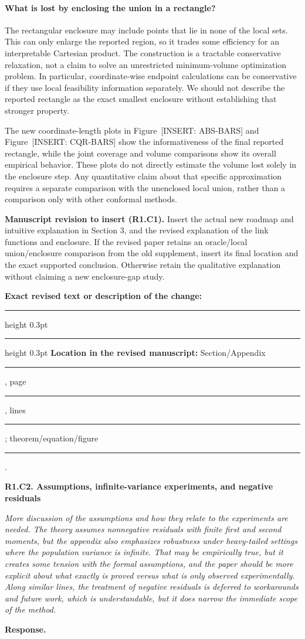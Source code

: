 \documentclass[11pt]{article}
\numberwithin{equation}{section}
\newcommand{\pending}[1]{\textcolor{AuthorRed}{[INSERT: #1]}}
\newcommand{\reviewercomment}[2]{%
  \par\medskip\noindent\textbf{#1}\par\nopagebreak
  \begingroup\color{ReviewerBlue}\itshape #2\par\endgroup
  \noindent\textbf{Response.} }
\newcommand{\revisionblock}[2]{%
  \par\begingroup\color{AuthorRed}\small
  \textbf{Manuscript revision to insert (#1).} #2\par
  \textbf{Exact revised text or description of the change:}\par
  \vspace{0.35em}\hrule height 0.3pt\vspace{1.4em}
  \hrule height 0.3pt\vspace{0.6em}
  \textbf{Location in the revised manuscript:}
  Section/Appendix \rule{1.3cm}{0.3pt},
  page \rule{1cm}{0.3pt},
  lines \rule{1.3cm}{0.3pt};
  theorem/equation/figure \rule{1.4cm}{0.3pt}.
  \par\endgroup}
\newcommand{\FigAbsoluteBars}{Figure~\pending{ABS-BARS}} %
\newcommand{\FigCQBars}{Figure~\pending{CQR-BARS}} %
\begin{document}
\paragraph{What is lost by enclosing the union in a rectangle?}
The rectangular enclosure may include points that lie in none of the
local sets. This can only enlarge the reported region, so it trades
some efficiency for an interpretable Cartesian product. The construction
is a tractable conservative relaxation, not a claim to solve an
unrestricted minimum-volume optimization problem. In particular,
coordinate-wise endpoint calculations can be conservative if they use
local feasibility information separately. We should not describe the
reported rectangle as the exact smallest enclosure without establishing
that stronger property.

The new coordinate-length plots in \FigAbsoluteBars{} and \FigCQBars{}
show the informativeness of the final reported rectangle, while the
joint coverage and volume comparisons show its overall empirical
behavior. These plots do not directly estimate the volume lost solely
in the enclosure step. Any quantitative claim about that specific
approximation requires a separate comparison with the unenclosed local
union, rather than a comparison only with other conformal methods.

\revisionblock{R1.C1}{Insert the actual new roadmap and intuitive
explanation in Section 3, and the revised explanation of the link
functions and enclosure. If the revised paper retains an oracle/local
union/enclosure comparison from the old supplement, insert its final
location and the exact supported conclusion. Otherwise retain the
qualitative explanation without claiming a new enclosure-gap study.}

\reviewercomment{R1.C2. Assumptions, infinite-variance experiments, and negative residuals}{%
More discussion of the assumptions and how they relate to the experiments
are needed. The theory assumes nonnegative residuals with finite first
and second moments, but the appendix also emphasizes robustness under
heavy-tailed settings where the population variance is infinite. That
may be empirically true, but it creates some tension with the formal
assumptions, and the paper should be more explicit about what exactly is
proved versus what is only observed experimentally. Along similar
lines, the treatment of negative residuals is deferred to workarounds
and future work, which is understandable, but it does narrow the
immediate scope of the method.}
\end{document}
